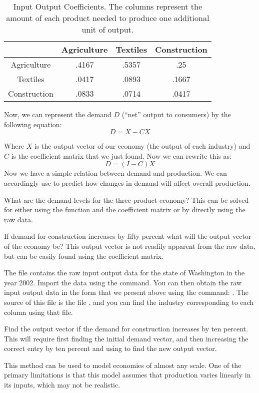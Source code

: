 \begin{table}

\begin{center}
\begin{tabular}{|c|c|c|c|} 
\hline
& Agriculture & Textiles & Construction \\ \hline
Agriculture & .4167 & .5357 & .25 \\ \hline
Textiles & .0417 & .0893 & .1667 \\ \hline
Construction & .0833 & .0714 & .0417 \\ \hline
\end{tabular}
\caption{Input Output Coefficients. The columns represent the amount of each product needed to produce one additional unit of output.} \label{IOCoefTable}
\end{center}
\end{table}

Now, we can represent the demand $D$ (``net'' output to consumers) by the following equation:
\[
D = X-CX
\]

Where $X$ is the output vector of our economy (the output of each industry) and $C$ is the coefficient matrix that we just found. Now we can rewrite this as:
\[
D = (I-C)X
\]
Now we have a simple relation between demand and production. We can accordingly use  to predict how changes in demand will affect overall production.

\begin{problem}
What are the demand levels for the three product economy? This can be solved for either using the  function and the coefficient matrix or by directly using the raw data.
\end{problem}

\begin{problem}
If demand for construction increases by fifty percent what will the output vector of the economy be? This output vector is not readily apparent from the raw data, but can be easily found using the coefficient matrix.
\end{problem}

\begin{problem}
The file  contains the raw input output data for the state of Washington in the year 2002. Import the data using the  command. You can then obtain the raw input output data in the form that we present above using the command: . The source of this file is the file , and you can find the industry corresponding to each column using that file.

Find the output vector if the demand for construction increases by ten percent. This will require first finding the initial demand vector, and then increasing the correct entry by ten percent and using  to find the new output vector.
\end{problem}

This method can be used to model economies of almost any scale. One of the primary limitations is that this model assumes that production varies linearly in its inputs, which may not be realistic.


